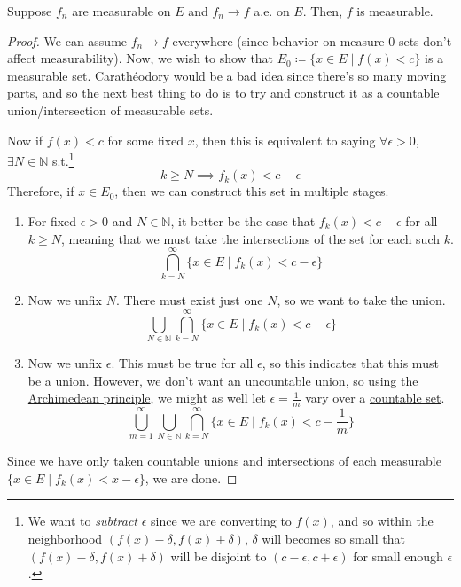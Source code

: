   \begin{theorem}
    \label{thm:almost-sure-convergence-of-measurable-functions}
    Suppose $f_n$ are measurable on $E$ and $f_n \to f$ a.e. on $E$. Then, $f$ is measurable. 
  \end{theorem}
  \begin{proof}
    We can assume $f_n \to f$ everywhere (since behavior on measure $0$ sets don't affect measurability). Now, we wish to show that $E_0 \coloneqq \{x \in E \mid f(x) < c\}$ is a measurable set. Carathéodory would be a bad idea since there's so many moving parts, and so the next best thing to do is to try and construct it as a countable union/intersection of measurable sets. 

    Now if $f(x) < c$ for some fixed $x$, then this is equivalent to saying $\forall \epsilon > 0$, $\exists N \in \mathbb{N}$ s.t.\footnote{We want to \textit{subtract} $\epsilon$ since we are converting to $f(x)$, and so within the neighborhood $(f(x) - \delta, f(x) + \delta)$, $\delta$ will becomes so small that $(f(x) - \delta, f(x) + \delta)$ will be disjoint to $(c - \epsilon, c + \epsilon)$ for small enough $\epsilon$. }
    \begin{equation}
      k \geq N \implies f_k (x) < c - \epsilon 
    \end{equation}
    Therefore, if $x \in E_0$, then we can construct this set in multiple stages. 
    \begin{enumerate}
      \item For fixed $\epsilon > 0$ and $N \in \mathbb{N}$, it better be the case that $f_k (x) < c - \epsilon$ for all $k \geq N$, meaning that we must take the intersections of the set for each such $k$. 
      \begin{equation}
        \bigcap_{k = N}^\infty \{ x \in E \mid f_k (x) < c - \epsilon \}
      \end{equation}

      \item Now we unfix $N$. There must exist just one $N$, so we want to take the union. 
      \begin{equation}
        \bigcup_{N \in \mathbb{N}} \bigcap_{k = N}^\infty \{ x \in E \mid f_k (x) < c - \epsilon \}
      \end{equation}

      \item Now we unfix $\epsilon$. This must be true for all $\epsilon$, so this indicates that this must be a union. However, we don't want an uncountable union, so using the \hyperref[real-def:archimedean-principle]{Archimedean principle}, we might as well let $\epsilon = \frac{1}{m}$ vary over a \hyperref[st-def:countable]{countable set}.  
      \begin{equation}
        \bigcup_{m = 1}^\infty \bigcup_{N \in \mathbb{N}} \bigcap_{k = N}^\infty \{ x \in E \mid f_k (x) < c - \frac{1}{m} \}
      \end{equation}
    \end{enumerate}
    Since we have only taken countable unions and intersections of each measurable $\{x \in E \mid f_k (x) < x - \epsilon\}$, we are done. 
  \end{proof}


